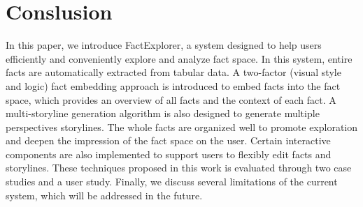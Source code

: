 \maketitle


\section{Conslusion} 
In this paper, we introduce FactExplorer, a system designed to help users efficiently and conveniently explore and analyze fact space. 
In this system, entire facts are automatically extracted from tabular data. 
A two-factor (visual style and logic) fact embedding approach is introduced to embed facts into the fact space, which provides an overview of all facts and the context of each fact. 
A multi-storyline generation algorithm is also designed to generate multiple perspectives storylines. The whole facts are organized well to promote exploration and deepen the impression of the fact space on the user. 
Certain interactive components are also implemented to support users to flexibly edit facts and storylines. 
These techniques proposed in this work is evaluated through two case studies and a user study. Finally, we discuss several limitations of the current system, which will be addressed in the future.